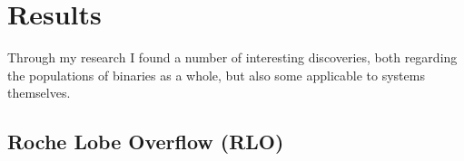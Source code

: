 \documentclass[12pt, a4paper]{article}
\begin{document}
    \section{\centering Results}
        Through my research I found a number of interesting discoveries, both regarding the populations of binaries as a whole, but also some applicable to systems themselves.
  
        \subsection{\centering Roche Lobe Overflow (RLO)}
            


\end{document}
